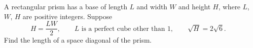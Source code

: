 A rectangular prism has a base of length $L$ and width $W$ and height $H$, where $L$, $W$, $H$ are positive integers. Suppose
\[
H=\dfrac{LW}{2},\qquad L \text{ is a perfect cube other than } 1,\qquad \sqrt H=2\sqrt6 .
\]
Find the length of a space diagonal of the prism.
